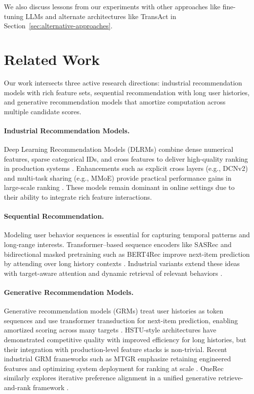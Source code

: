 \documentclass[sigconf]{acmart}
\begin{document}
We also discuss lessons from our experiments with other approaches like fine-tuning LLMs and alternate architectures like TransAct \cite{xia2023transact} in Section~\ref{sec:alternative-approaches}.

\section{Related Work}
\label{sec:related_work}

Our work intersects three active research directions: industrial recommendation models with rich feature sets, sequential recommendation with long user histories, and generative recommendation models that amortize computation across multiple candidate scores.

\paragraph{Industrial Recommendation Models.}
Deep Learning Recommendation Models (DLRMs) combine dense numerical features, sparse categorical IDs, and cross features to deliver high-quality ranking in production systems \cite{naumov2019dlrm,cheng2016wide}. Enhancements such as explicit cross layers (e.g., DCNv2) and multi-task sharing (e.g., MMoE) provide practical performance gains in large-scale ranking \cite{wang2021dcnv2,ma2018mmoe}. These models remain dominant in online settings due to their ability to integrate rich feature interactions.

\paragraph{Sequential Recommendation.}
Modeling user behavior sequences is essential for capturing temporal patterns and long-range interests. Transformer–based sequence encoders like SASRec and bidirectional masked pretraining such as BERT4Rec improve next-item prediction by attending over long history contexts \cite{kang2018sasrec,sun2019bert4rec}. Industrial variants extend these ideas with target-aware attention and dynamic retrieval of relevant behaviors \cite{pei2021end2endbehaviorretrieval}.

\paragraph{Generative Recommendation Models.}
Generative recommendation models (GRMs) treat user histories as token sequences and use transformer transduction for next-item prediction, enabling amortized scoring across many targets \cite{zhai2024actions}. HSTU-style architectures have demonstrated competitive quality with improved efficiency for long histories, but their integration with production-level feature stacks is non-trivial. Recent industrial GRM frameworks such as MTGR emphasize retaining engineered features and optimizing system deployment for ranking at scale \cite{han2025mtgr}. OneRec similarly explores iterative preference alignment in a unified generative retrieve-and-rank framework \cite{deng2025onerec}.
\end{document}
